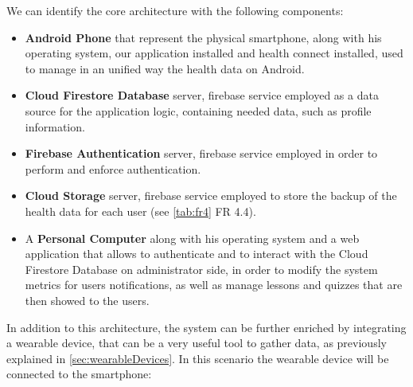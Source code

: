 \newpage
\noindent We can identify the core architecture with the following components:
\vspace{3ex}
\begin{itemize}[nosep] %
    \item \textbf{Android Phone} that represent the physical smartphone, along with his operating system, our application installed and health connect installed, used to manage in an unified way the health data on Android.
    \item \textbf{Cloud Firestore Database} server, firebase service employed as a data source for the application logic, containing needed data, such as profile information.
    \item \textbf{Firebase Authentication} server, firebase service employed in order to perform and enforce authentication.
    \item \textbf{Cloud Storage} server, firebase service employed to store the backup of the health data for each user (see \cref{tab:fr4} FR 4.4).
    \item A \textbf{Personal Computer} along with his operating system and a web application that allows to authenticate and to interact with the Cloud Firestore Database on administrator side, in order to modify the system metrics for users notifications, as well as manage lessons and quizzes that are then showed to the users.  
\end{itemize}
\newpage
\noindent In addition to this architecture, the system can be further enriched by integrating a wearable device, that can be a very useful tool to gather data, as previously explained in \cref{sec:wearableDevices}. In this scenario the wearable device will be connected to the smartphone:

